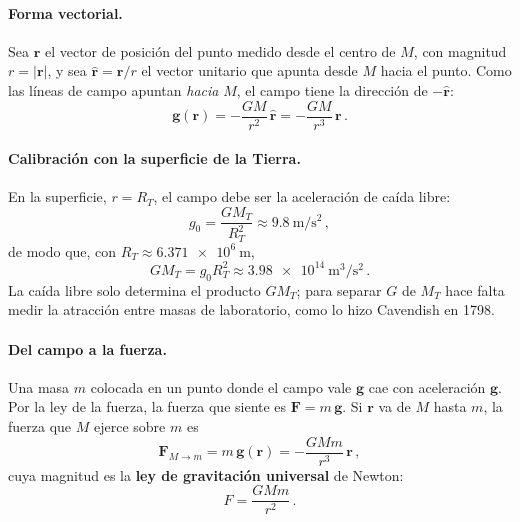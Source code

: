 \documentclass[11pt,a4paper]{book}
\begin{document}
\paragraph{Forma vectorial.}
Sea $\boldsymbol{r}$ el vector de posición del punto medido desde el centro de
$M$, con magnitud $r = \lvert\boldsymbol{r}\rvert$, y sea
$\hat{\boldsymbol{r}} = \boldsymbol{r}/r$ el vector unitario que apunta desde
$M$ hacia el punto. Como las líneas de campo apuntan \emph{hacia} $M$, el
campo tiene la dirección de $-\hat{\boldsymbol{r}}$:
\begin{equation}
  \boxed{\boldsymbol{g}(\boldsymbol{r})
    = -\frac{G M}{r^{2}}\,\hat{\boldsymbol{r}}
    = -\frac{G M}{r^{3}}\,\boldsymbol{r}} \,.
  \label{eq:campo_g_vectorial}
\end{equation}

\paragraph{Calibración con la superficie de la Tierra.}
En la superficie, $r = R_T$, el campo debe ser la aceleración de caída libre:
\begin{equation}
  g_0 = \frac{G M_T}{R_T^{2}} \approx \SI{9.8}{\meter\per\second\squared} \,,
  \label{eq:calibracion_g0}
\end{equation}
de modo que, con $R_T \approx \SI{6.371e6}{\meter}$,
\begin{equation}
  G M_T = g_0 R_T^{2}
  \approx \SI{3.98e14}{\meter\cubed\per\second\squared} \,.
  \label{eq:calibracion_GM}
\end{equation}
La caída libre solo determina el producto $G M_T$; para separar $G$ de $M_T$
hace falta medir la atracción entre masas de laboratorio, como lo hizo
Cavendish en 1798.

\paragraph{Del campo a la fuerza.}
Una masa $m$ colocada en un punto donde el campo vale $\boldsymbol{g}$ cae con
aceleración $\boldsymbol{g}$. Por la ley de la fuerza, la fuerza que siente es
$\boldsymbol{F} = m\,\boldsymbol{g}$. Si $\boldsymbol{r}$ va de $M$ hasta $m$,
la fuerza que $M$ ejerce sobre $m$ es
\begin{equation}
  \boldsymbol{F}_{M \to m} = m\,\boldsymbol{g}(\boldsymbol{r})
  = -\frac{G M m}{r^{3}}\,\boldsymbol{r} \,,
  \label{eq:GravitationalForce}
\end{equation}
cuya magnitud es la \textbf{ley de gravitación universal} de Newton:
\begin{equation}
  F = \frac{G M m}{r^{2}} \,.
  \label{eq:ley_gravitacion}
\end{equation}
\end{document}
